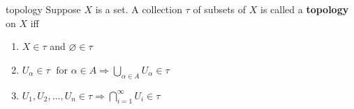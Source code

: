 \documentclass[avery5371,grid]{flashcards}
\begin{document}
\begin{flashcard}[Definition]{topology}
Suppose $X$ is a set.  A collection $\tau$ of subsets of $X$ is called
a \mbox{\textbf{topology}} on $X$ iff
\begin{enumerate}
 \item $X \in \tau$ and $\varnothing \in \tau$
 \item $U_{\alpha} \in \tau \;
 \mbox{ for } \alpha \in A \Rightarrow
 \displaystyle \bigcup_{\alpha \in A} U_{\alpha} \in \tau$
 \item $U_1, U_2, \ldots , U_n \in \tau \Rightarrow
 \displaystyle \bigcap_{i=1}^{\infty} U_i \in \tau$
\end{enumerate}
\end{flashcard}

\end{document}
